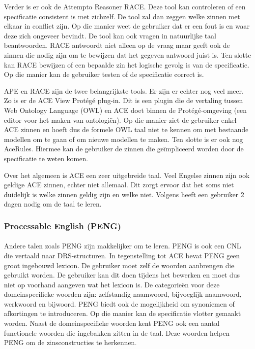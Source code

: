 \documentclass[]{article}
\theoremstyle{definition}
\begin{document}
Verder is er ook de Attempto Reasoner RACE. Deze tool kan controleren of een specificatie consistent is met zichzelf. De tool zal dan zeggen welke zinnen met elkaar in conflict zijn. Op die manier weet de gebruiker dat er een fout is en waar deze zich ongeveer bevindt. De tool kan ook vragen in natuurlijke taal beantwoorden. RACE antwoordt niet alleen op de vraag maar geeft ook de zinnen die nodig zijn om te bewijzen dat het gegeven antwoord juist is. Ten slotte kan RACE bewijzen of een bepaalde zin het logische gevolg is van de specificatie. Op die manier kan de gebruiker testen of de specificatie correct is.

APE en RACE zijn de twee belangrijkste tools. Er zijn er echter nog veel meer. Zo is er de ACE View Protégé plug-in. Dit is een plugin die de vertaling tussen Web Ontology Language (OWL) en ACE doet binnen de Protégé-omgeving (een editor voor het maken van ontologiën). Op die manier ziet de gebruiker enkel ACE zinnen en hoeft dus de formele OWL taal niet te kennen om met bestaande modellen om te gaan of om nieuwe modellen te maken. Ten slotte is er ook nog AceRules. Hiermee kan de gebruiker de zinnen die geïmpliceerd worden door de specificatie te weten komen.

Over het algemeen is ACE een zeer uitgebreide taal. Veel Engelse zinnen zijn ook geldige ACE zinnen, echter niet allemaal. Dit zorgt ervoor dat het soms niet duidelijk is welke zinnen geldig zijn en welke niet. Volgens \cite{Fuchs2008} heeft een gebruiker 2 dagen nodig om de taal te leren.

\subsubsection{Processable English (PENG)}
\paragraph{} Andere talen zoals PENG\cite{Schwitter2002} zijn makkelijker om te leren. PENG is ook een CNL die vertaald naar DRS-structuren. In tegenstelling tot ACE bevat PENG geen groot ingebouwd lexicon. De gebruiker moet zelf de woorden aanbrengen die gebruikt worden. De gebruiker kan dit doen tijdens het bewerken en moet dus niet op voorhand aangeven wat het lexicon is. De categorieën voor deze domeinspecifieke woorden zijn: zelfstandig naamwoord, bijvoeglijk naamwoord, werkwoord en bijwoord. PENG biedt ook de mogelijkheid om synoniemen of afkortingen te introduceren. Op die manier kan de specificatie vlotter gemaakt worden. Naast de domeinspecifieke woorden kent PENG ook een aantal functionele woorden die ingebakken zitten in de taal. Deze woorden helpen PENG om de zinsconstructies te herkennen.
\end{document}
